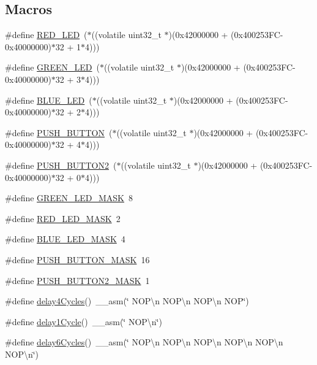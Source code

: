 \subsection*{Macros}
\begin{DoxyCompactItemize}
\item 
\#define \mbox{\hyperlink{satej__matthew_8c_a073dbcb7f5bc4f4b45dc048b55eaff3d}{R\+E\+D\+\_\+\+L\+ED}}~($\ast$((volatile uint32\+\_\+t $\ast$)(0x42000000 + (0x400253\+F\+C-\/0x40000000)$\ast$32 + 1$\ast$4)))
\item 
\#define \mbox{\hyperlink{satej__matthew_8c_a01649d652fa50957c6ef3c32b1238038}{G\+R\+E\+E\+N\+\_\+\+L\+ED}}~($\ast$((volatile uint32\+\_\+t $\ast$)(0x42000000 + (0x400253\+F\+C-\/0x40000000)$\ast$32 + 3$\ast$4)))
\item 
\#define \mbox{\hyperlink{satej__matthew_8c_a41c7fcbe209a1c236fd1b8e35bd8b55a}{B\+L\+U\+E\+\_\+\+L\+ED}}~($\ast$((volatile uint32\+\_\+t $\ast$)(0x42000000 + (0x400253\+F\+C-\/0x40000000)$\ast$32 + 2$\ast$4)))
\item 
\#define \mbox{\hyperlink{satej__matthew_8c_aebf19233811cf4cf11ddeb722b6a2850}{P\+U\+S\+H\+\_\+\+B\+U\+T\+T\+ON}}~($\ast$((volatile uint32\+\_\+t $\ast$)(0x42000000 + (0x400253\+F\+C-\/0x40000000)$\ast$32 + 4$\ast$4)))
\item 
\#define \mbox{\hyperlink{satej__matthew_8c_afc15afb38fa2f0f9fb1448682c2fd356}{P\+U\+S\+H\+\_\+\+B\+U\+T\+T\+O\+N2}}~($\ast$((volatile uint32\+\_\+t $\ast$)(0x42000000 + (0x400253\+F\+C-\/0x40000000)$\ast$32 + 0$\ast$4)))
\item 
\#define \mbox{\hyperlink{satej__matthew_8c_a102cef24f52add2a38ee01eccbf27bcb}{G\+R\+E\+E\+N\+\_\+\+L\+E\+D\+\_\+\+M\+A\+SK}}~8
\item 
\#define \mbox{\hyperlink{satej__matthew_8c_a2de27af622c55526783a345c21cec42e}{R\+E\+D\+\_\+\+L\+E\+D\+\_\+\+M\+A\+SK}}~2
\item 
\#define \mbox{\hyperlink{satej__matthew_8c_a6f2788e548d65bbb864b965c72a7bf56}{B\+L\+U\+E\+\_\+\+L\+E\+D\+\_\+\+M\+A\+SK}}~4
\item 
\#define \mbox{\hyperlink{satej__matthew_8c_aa39095336c165058ffd24cc58287f407}{P\+U\+S\+H\+\_\+\+B\+U\+T\+T\+O\+N\+\_\+\+M\+A\+SK}}~16
\item 
\#define \mbox{\hyperlink{satej__matthew_8c_a061bf1fc7521f6b5d85598f063e87c30}{P\+U\+S\+H\+\_\+\+B\+U\+T\+T\+O\+N2\+\_\+\+M\+A\+SK}}~1
\item 
\#define \mbox{\hyperlink{satej__matthew_8c_a2ab1667016c16a6f0a44904c63a6f188}{delay4\+Cycles}}()~\+\_\+\+\_\+asm(\char`\"{} N\+O\+P\textbackslash{}n N\+O\+P\textbackslash{}n N\+O\+P\textbackslash{}n N\+OP\char`\"{})
\item 
\#define \mbox{\hyperlink{satej__matthew_8c_a056fe4f6b582ad913e07654bb2bf1980}{delay1\+Cycle}}()~\+\_\+\+\_\+asm(\char`\"{} N\+O\+P\textbackslash{}n\char`\"{})
\item 
\#define \mbox{\hyperlink{satej__matthew_8c_aebf11bb4f185afba013bb3946fd88992}{delay6\+Cycles}}()~\+\_\+\+\_\+asm(\char`\"{} N\+O\+P\textbackslash{}n N\+O\+P\textbackslash{}n N\+O\+P\textbackslash{}n N\+O\+P\textbackslash{}n N\+O\+P\textbackslash{}n N\+O\+P\textbackslash{}n\char`\"{})
\end{DoxyCompactItemize}
